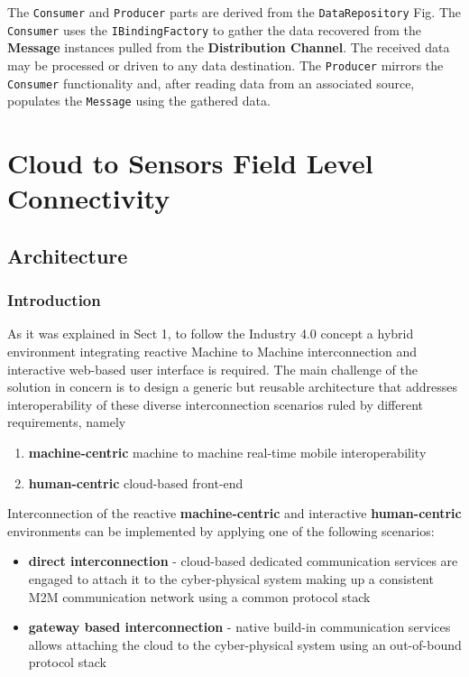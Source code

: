\documentclass[
]{article}
\providecommand{\tightlist}{%
  \setlength{\itemsep}{0pt}\setlength{\parskip}{0pt}}
\begin{document}
The \texttt{Consumer} and \texttt{Producer} parts are derived from the
\texttt{DataRepository} Fig. The \texttt{Consumer} uses the
\texttt{IBindingFactory} to gather the data recovered from the
\textbf{Message} instances pulled from the \textbf{Distribution
Channel}. The received data may be processed or driven to any data
destination. The \texttt{Producer} mirrors the \texttt{Consumer}
functionality and, after reading data from an associated source,
populates the \texttt{Message} using the gathered data.

\hypertarget{cloud-to-sensors-field-level-connectivity}{%
\section{Cloud to Sensors Field Level
Connectivity}\label{cloud-to-sensors-field-level-connectivity}}

\hypertarget{architecture}{%
\subsection{Architecture}\label{architecture}}

\hypertarget{introduction-1}{%
\subsubsection{Introduction}\label{introduction-1}}

As it was explained in Sect 1, to follow the Industry 4.0 concept a
hybrid environment integrating reactive Machine to Machine
interconnection and interactive web-based user interface is required.
The main challenge of the solution in concern is to design a generic but
reusable architecture that addresses interoperability of these diverse
interconnection scenarios ruled by different requirements, namely

\begin{enumerate}
\def\labelenumi{\arabic{enumi}.}
\tightlist
\item
  \textbf{machine-centric} machine to machine real-time mobile
  interoperability
\item
  \textbf{human-centric} cloud-based front-end
\end{enumerate}

Interconnection of the reactive \textbf{machine-centric} and interactive
\textbf{human-centric} environments can be implemented by applying one
of the following scenarios:

\begin{itemize}
\tightlist
\item
  \textbf{direct interconnection} - cloud-based dedicated communication
  services are engaged to attach it to the cyber-physical system making
  up a consistent M2M communication network using a common protocol
  stack
\item
  \textbf{gateway based interconnection} - native build-in communication
  services allows attaching the cloud to the cyber-physical system using
  an out-of-bound protocol stack
\end{itemize}
\end{document}
